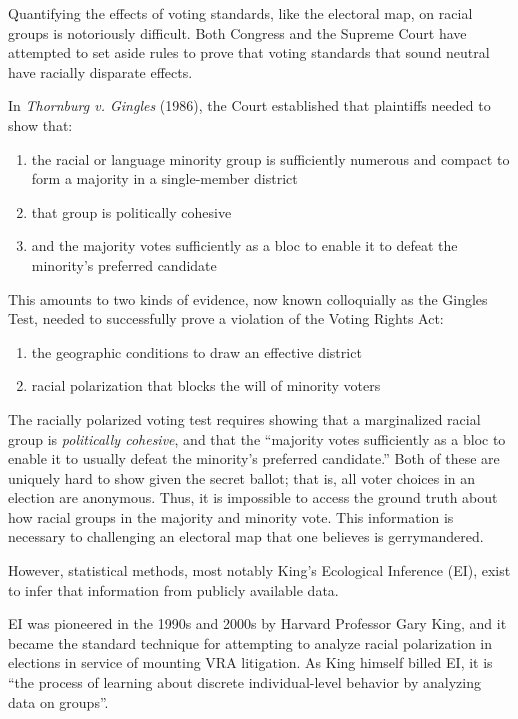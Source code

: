 Quantifying the effects of voting standards, like the electoral map, on racial groups is notoriously difficult. Both Congress and the Supreme Court have attempted to set aside rules to prove that voting standards that sound neutral have racially disparate effects.

In \textit{Thornburg v. Gingles} (1986)\cite{thornburg}, the Court established that plaintiffs needed to show that:

\begin{enumerate}
 \item the racial or language minority group is sufficiently numerous and compact to form a majority in a single-member district
 \item that group is politically cohesive
 \item and the majority votes sufficiently as a bloc to enable it to defeat the minority’s preferred candidate
\end{enumerate}

This amounts to two kinds of evidence, now known colloquially as the Gingles Test, needed to successfully prove a violation of the Voting Rights Act:

\begin{enumerate}
 \item the geographic conditions to draw an effective district
 \item racial polarization that blocks the will of minority voters
\end{enumerate}

The racially polarized voting test requires showing that a marginalized racial group is \textit{politically cohesive}, and that the “majority votes sufficiently as a bloc to enable it to usually defeat the minority’s preferred candidate.” Both of these are uniquely hard to show given the secret ballot; that is, all voter choices in an election are anonymous. Thus, it is impossible to access the ground truth about how racial groups in the majority and minority vote. This information is necessary to challenging an electoral map that one believes is gerrymandered.

However, statistical methods, most notably King’s Ecological Inference (EI)\cite{king1999}, exist to infer that information from publicly available data.

EI was pioneered in the 1990s and 2000s by Harvard Professor Gary King, and it became the standard technique for attempting to analyze racial polarization in elections in service of mounting VRA litigation. As King himself billed EI, it is “the process of learning about discrete individual-level behavior by analyzing data on groups”\cite{king1999}.

